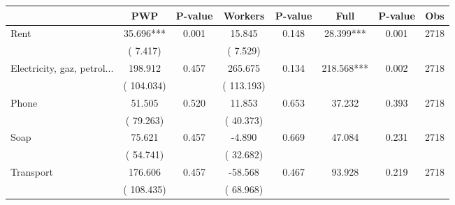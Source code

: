 
\begin{tabular}{l*{7}{c}}\hline&\multicolumn{1}{c}{PWP}&\multicolumn{1}{c}{P-value}&\multicolumn{1}{c}{Workers}&\multicolumn{1}{c}{P-value}&\multicolumn{1}{c}{Full}&\multicolumn{1}{c}{P-value}&\multicolumn{1}{c}{Obs} \\ \hline

 Rent       &             35.696***       &        0.001  &             15.845       &        0.148  &             28.399***       &              0.001 &  2718 \\ 
                       &       (       7.417)             &                               &       (       7.529)                     &                               &                                               &                                &                      \\ 

 Electricity, gaz, petrol...       &            198.912       &        0.457  &            265.675       &        0.134  &            218.568***       &              0.002 &  2718 \\ 
                       &       (     104.034)             &                               &       (     113.193)                     &                               &                                               &                                &                      \\ 

 Phone       &             51.505       &        0.520  &             11.853       &        0.653  &             37.232       &              0.393 &  2718 \\ 
                       &       (      79.263)             &                               &       (      40.373)                     &                               &                                               &                                &                      \\ 

 Soap       &             75.621       &        0.457  &             -4.890       &        0.669  &             47.084       &              0.231 &  2718 \\ 
                       &       (      54.741)             &                               &       (      32.682)                     &                               &                                               &                                &                      \\ 

 Transport       &            176.606       &        0.457  &            -58.568       &        0.467  &             93.928       &              0.219 &  2718 \\ 
                       &       (     108.435)             &                               &       (      68.968)                     &                               &                                               &                                &                      \\ 


\end{tabular}
